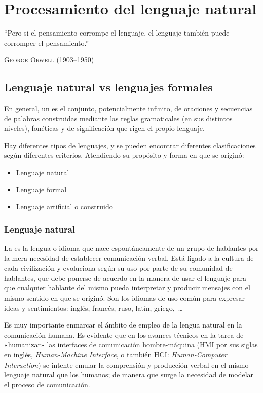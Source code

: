 
\chapter{Procesamiento del lenguaje natural}

\epigraph{``Pero si el pensamiento corrompe el lenguaje, el lenguaje también puede corromper el pensamiento.''}{\textsc{George Orwell} (1903--1950)}

\section{Lenguaje natural vs lenguajes formales}

En general, un  es el conjunto, potencialmente infinito, de oraciones y secuencias de palabras construidas mediante las reglas gramaticales (en sus distintos niveles), fonéticas y de significación que rigen el propio lenguaje.

Hay diferentes tipos de lenguajes, y se pueden encontrar diferentes clasificaciones según diferentes criterios. Atendiendo su propósito y forma en que se originó:
\nopagebreak
\begin{itemize}
\item Lenguaje natural
\item Lenguaje formal
\item Lenguaje artificial o construido
\end{itemize}

\FloatBarrier
\subsection{Lenguaje natural}

La  es la lengua o idioma que nace espontáneamente de un grupo de hablantes por la mera necesidad de establecer comunicación verbal. Está ligado a la cultura de cada civilización y evoluciona según su uso por parte de su comunidad de hablantes, que debe ponerse de acuerdo en la manera de usar el lenguaje para que cualquier hablante del mismo pueda interpretar y producir mensajes con el mismo sentido en que se originó. Son los idiomas de uso común para expresar ideas y sentimientos: inglés, francés, ruso, latín, griego,~\ldots

Es muy importante enmarcar el ámbito de empleo de la lengua natural en la comunicación humana. Es evidente que en los avances técnicos en la tarea de «humanizar» las interfaces de comunicación hombre-máquina (HMI por sus siglas en inglés, \emph{Human-Machine Interface}, o también HCI: \emph{Human-Computer Interaction}) se intente emular la comprensión y producción verbal en el mismo lenguaje natural que los humanos; de manera que surge la necesidad de modelar el proceso de comunicación.

